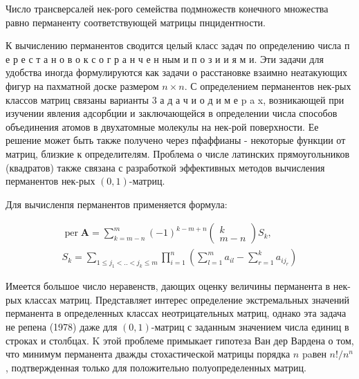 \documentclass[10pt]{article}
\begin{document}
Число трансверсалей нек-рого семейства подмножеств конечного множества равно перманенту соответствующей матрицы пнцидентности.



К вычислению перманентов сводится целый класс задач по определению числа п е р е с т а н о в о к с о г р а н ч е н ным и п о з и и я м и. Эти задачи для удобства иногда формулируются как задачи о расстановке взаимно неатакующих фигур на пахматной доске размером $n \times n$. С определением перманентов нек-рых классов матриц связаны варианты 3 а д а ч и о д и м е p a x, возникающей при изучении явления адсорбции и заключающейся в определении числа способов объединения атомов в двухатомные молекулы на нек-рой поверхности. Ее решение может быть также получено через пфаффианы - некоторые функции от матриц, близкие к определителям. Проблема о числе латинских прямоугольников (квадратов) также связана с разработкой эффективных методов вычисления перманентов нек-рых $(0,1)$-матриц.



Для вычисленпя перманентов применяется формула:



\[

\begin{gathered}

\operatorname{per} \boldsymbol{A}=\sum_{k=m-n}^{m}(-1)^{k-m+n}\left(\begin{array}{c}

k \\

m-n

\end{array}\right) S_{k}, \\

S_{k}=\sum_{1 \leqslant j_{1}<. .<j_{k} \leqslant m} \prod_{i=1}^{n}\left(\sum_{l=1}^{m} a_{i l}-\sum_{r=1}^{k} a_{i j_{r}}\right)

\end{gathered}

\]



Имеется большое число неравенств, дающих оценку величины перманента в нек-рых классах матриц. Представляет интерес определение экстремальных значений перманента в определенных классах неотрицательных матриц, однако эта задача не репена (1978) даже для $(0,1)$-матриц с заданным значением числа единиц в строках и столбцах. $\mathrm{K}$ этой проблеме примыкает гипотеза Ван дер Вардена о том, что минимум перманента дважды стохастической матрицы порядка $n$ paвен $n ! / n^{n}$, подтвержденная только для положительно полуопределенных матриц.
\end{document}
